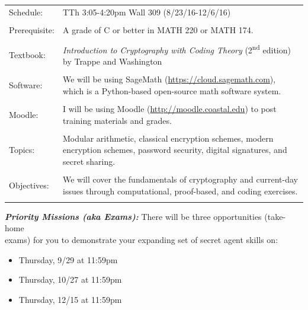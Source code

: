 \documentclass[10pt]{extarticle}
\begin{document}
\begin{tabular}{p{3cm} p{12.6cm}}
Schedule:	&  TTh 3:05-4:20pm Wall 309 (8/23/16-12/6/16)
\\
\\

Prerequisite: &  A grade of C or better in MATH 220 or MATH 174.\\
\\

Textbook:	& \emph{Introduction to Cryptography with Coding Theory} (2\textsuperscript{nd} edition) by Trappe and Washington \\
\\

Software: & We will be using SageMath (\url{https://cloud.sagemath.com}), which is a Python-based open-source math software system.\\ \\


Moodle: & I will be using Moodle (\url{http://moodle.coastal.edu}) to post training materials and grades.\\
\\
Topics:	& Modular arithmetic, classical encryption schemes, modern encryption schemes, password security, digital signatures, and secret sharing.\\
\\

Objectives: & We will cover the fundamentals of cryptography and current-day issues through computational, proof-based, and coding exercises.  \\ \\
\end{tabular}

\bigskip


\emph{\bf Priority Missions (aka Exams):} There will be three opportunities (take-home\\
exams) for you to demonstrate your expanding set of secret agent skills on:
\begin{itemize}
\item Thursday, 9/29 at 11:59pm
\item Thursday, 10/27 at 11:59pm
\item Thursday, 12/15 at 11:59pm
\end{itemize}

\bigskip
\end{document}

